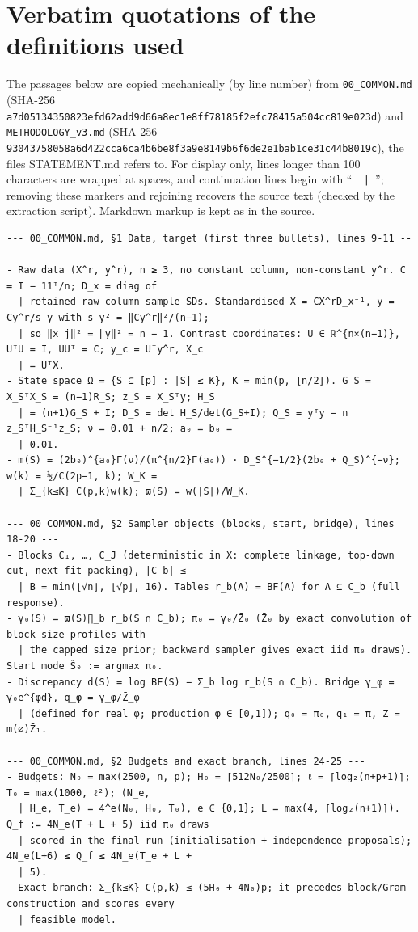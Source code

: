 \documentclass[11pt]{report}
\begin{document}
\section{Verbatim quotations of the definitions used}
The passages below are copied mechanically (by line number) from \texttt{00\_COMMON.md} (SHA-256 \texttt{a7d05134350823efd62add9d66a8ec1e8ff78185f2efc78415a504cc819e023d}) and \texttt{METHODOLOGY\_v3.md} (SHA-256 \texttt{93043758058a6d422cca6ca4b6be8f3a9e8149b6f6de2e1bab1ce31c44b8019c}), the files STATEMENT.md refers to. For display only, lines longer than 100 characters are wrapped at spaces, and continuation lines begin with ``\texttt{\ \ |\ }''; removing these markers and rejoining recovers the source text (checked by the extraction script). Markdown markup is kept as in the source.
\begin{Verbatim}[fontsize=\footnotesize,formatcom=\qfont]
--- 00_COMMON.md, §1 Data, target (first three bullets), lines 9-11 ---
- Raw data (X^r, y^r), n ≥ 3, no constant column, non-constant y^r. C = I − 11ᵀ/n; D_x = diag of
  | retained raw column sample SDs. Standardised X = CX^rD_x⁻¹, y = Cy^r/s_y with s_y² = ‖Cy^r‖²/(n−1);
  | so ‖x_j‖² = ‖y‖² = n − 1. Contrast coordinates: U ∈ ℝ^{n×(n−1)}, UᵀU = I, UUᵀ = C; y_c = Uᵀy^r, X_c
  | = UᵀX.
- State space Ω = {S ⊆ [p] : |S| ≤ K}, K = min(p, ⌊n/2⌋). G_S = X_SᵀX_S = (n−1)R_S; z_S = X_Sᵀy; H_S
  | = (n+1)G_S + I; D_S = det H_S/det(G_S+I); Q_S = yᵀy − n z_SᵀH_S⁻¹z_S; ν = 0.01 + n/2; a₀ = b₀ =
  | 0.01.
- m(S) = (2b₀)^{a₀}Γ(ν)/(π^{n/2}Γ(a₀)) · D_S^{−1/2}(2b₀ + Q_S)^{−ν}; w(k) = ½/C(2p−1, k); W_K =
  | Σ_{k≤K} C(p,k)w(k); ϖ(S) = w(|S|)/W_K.

--- 00_COMMON.md, §2 Sampler objects (blocks, start, bridge), lines 18-20 ---
- Blocks C₁, …, C_J (deterministic in X: complete linkage, top-down cut, next-fit packing), |C_b| ≤
  | B = min(⌊√n⌋, ⌊√p⌋, 16). Tables r_b(A) = BF(A) for A ⊆ C_b (full response).
- γ₀(S) = ϖ(S)∏_b r_b(S ∩ C_b); π₀ = γ₀/Z̄₀ (Z̄₀ by exact convolution of block size profiles with
  | the capped size prior; backward sampler gives exact iid π₀ draws). Start mode S̃₀ := argmax π₀.
- Discrepancy d(S) = log BF(S) − Σ_b log r_b(S ∩ C_b). Bridge γ_φ = γ₀e^{φd}, q_φ = γ_φ/Z̄_φ
  | (defined for real φ; production φ ∈ [0,1]); q₀ = π₀, q₁ = π, Z = m(∅)Z̄₁.

--- 00_COMMON.md, §2 Budgets and exact branch, lines 24-25 ---
- Budgets: N₀ = max(2500, n, p); H₀ = ⌈512N₀/2500⌉; ℓ = ⌈log₂(n+p+1)⌉; T₀ = max(1000, ℓ²); (N_e,
  | H_e, T_e) = 4^e(N₀, H₀, T₀), e ∈ {0,1}; L = max(4, ⌈log₂(n+1)⌉). Q_f := 4N_e(T + L + 5) iid π₀ draws
  | scored in the final run (initialisation + independence proposals); 4N_e(L+6) ≤ Q_f ≤ 4N_e(T_e + L +
  | 5).
- Exact branch: Σ_{k≤K} C(p,k) ≤ (5H₀ + 4N₀)p; it precedes block/Gram construction and scores every
  | feasible model.


\end{Verbatim}
\end{document}
